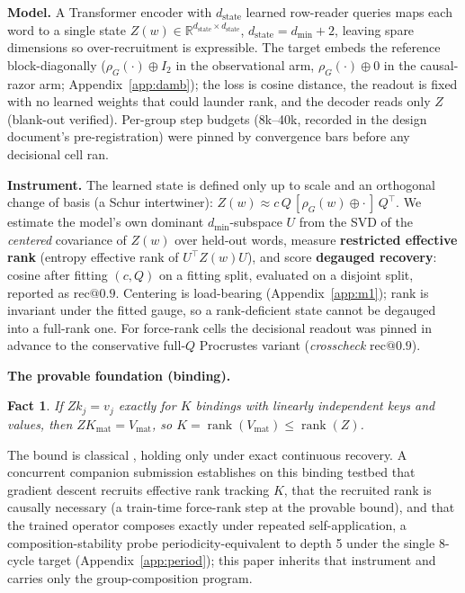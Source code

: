 \documentclass[mlabstract,onecolumn]{jmlr}
\makeatletter
\newtheorem{fact}{Fact}
\newcommand{\R}{\mathbb{R}}
\newcommand{\rank}{\operatorname{rank}}
\newcommand{\dmin}{d_{\min}}
\newcommand{\dstate}{d_{\mathrm{state}}}
\newcommand{\recninety}{\mathrm{rec}@0.9}
\makeatother
\begin{document}
\textbf{Model.} A Transformer encoder with $\dstate$ learned row-reader
queries maps each word to a single state
$Z(w) \in \R^{\dstate \times \dstate}$, $\dstate = \dmin + 2$, leaving
spare dimensions so over-recruitment is expressible. The target embeds
the reference block-diagonally ($\rho_G(\cdot) \oplus I_2$ in the
observational arm, $\rho_G(\cdot) \oplus 0$ in the causal-razor arm;
Appendix~\ref{app:damb}); the loss is cosine
distance, the readout is fixed with no learned weights that could launder
rank, and the decoder reads only $Z$ (blank-out verified). Per-group
step budgets (8k--40k, recorded in the design document's
pre-registration) were pinned by convergence bars before any decisional
cell ran.

\textbf{Instrument.} The learned state is defined only up to scale and an
orthogonal change of basis (a Schur intertwiner):
$Z(w) \approx c\,Q\,[\rho_G(w) \oplus \cdot\,]\,Q^{\top}$. We estimate the
model's own dominant $\dmin$-subspace $U$ from the SVD of the
\emph{centered} covariance of $Z(w)$ over held-out words, measure
\textbf{restricted effective rank} (entropy effective rank of
$U^{\top} Z(w) U$), and score \textbf{degauged recovery}: cosine after
fitting $(c, Q)$ on a fitting split, evaluated on a disjoint split,
reported as $\recninety$. Centering is load-bearing
(Appendix~\ref{app:m1}); rank is invariant under the fitted gauge, so a
rank-deficient state cannot be degauged into a full-rank one. For
force-rank cells the decisional readout was pinned in advance to the
conservative full-$Q$ Procrustes variant (\emph{crosscheck}
$\recninety$).


\textbf{The provable foundation (binding).}
\begin{fact}
\label{fact:bound}
If $Z k_j = v_j$ exactly for $K$ bindings with linearly independent keys
and values, then $Z K_{\mathrm{mat}} = V_{\mathrm{mat}}$, so
$K = \rank(V_{\mathrm{mat}}) \leq \rank(Z)$.
\end{fact}

The bound is classical \citep{kohonen1972correlation,
anderson1972simple}, holding only under exact continuous recovery. A
concurrent companion submission establishes on this binding testbed
that gradient descent recruits effective rank tracking $K$, that the
recruited rank is causally necessary (a train-time force-rank step at
the provable bound), and that the trained operator composes exactly
under repeated self-application, a composition-stability probe
periodicity-equivalent to depth 5 under the single 8-cycle target
\citep{liu2023shortcuts} (Appendix~\ref{app:period}); this paper
inherits that instrument and carries only the group-composition
program.
\end{document}
